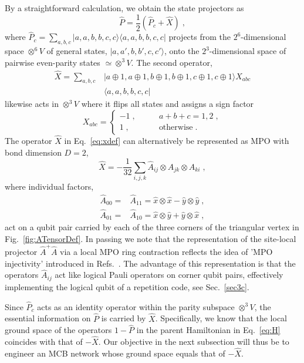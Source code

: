 \documentclass[twocolumn,floats,prx,showpacs]{revtex4-1}
\newcommand{\ket}[1]{|#1\rangle}
\newcommand{\bra}[1]{\langle#1|}
\begin{document}
By a straightforward calculation, we obtain the state projectors as 
\begin{equation}
\hat P =\frac{1}{2} (\hat P_c +\hat X)\;,
\end{equation}
where $\hat P_c=\sum_{a,b,c} \ket{a,a,b,b,c,c} \bra{a,a,b,b,c,c}$
projects from the $2^6$-dimensional space $\otimes^6 V$ of general states, $\ket{a,a',b,b',c,c'}$, onto the $2^3$-dimensional space of 
pairwise even-parity states $\simeq \otimes^3 V$. 
The second operator,
\begin{align}
\hat X=\sum_{a,b,c} &\ket{a\oplus 1,a\oplus 1,b\oplus 1,b\oplus 1,c\oplus 1,c \oplus 1} X_{abc} \nonumber \\ &\bra{a,a,b,b,c,c}
\label{eq:xdef}
\end{align}
likewise acts in $\otimes^3V$ where it flips all states and assigns a sign factor 
\begin{equation}\label{eq:xdef1b}
X_{abc} = \begin{cases} -1\;, \qquad & a+b+c=1,2\;, \\ 1\;, \qquad  &\text{otherwise}\;. 
\end{cases}
\end{equation}
The operator $\hat X$ in Eq.~\eqref{eq:xdef} can alternatively be represented as MPO with bond dimension $D=2$,
\begin{equation}\label{eq:xdef2}
\hat X = - \frac{1}{32} \sum_{i,j,k} \hat A_{ij} \otimes \hat A_{jk} \otimes \hat A_{ki}\;,
\end{equation}
where individual factors, 
\begin{align}\nonumber
\hat A_{00}=& \hat A_{11} = \hat x \otimes \hat x -\hat y \otimes \hat y\;, \\ \label{eq:logpauli}
\hat A_{01}=& \hat A_{10}=\hat x \otimes \hat y + \hat y \otimes \hat x \; ,
\end{align}
act on a qubit pair carried by each of the three corners
of the triangular vertex in Fig.~\ref{fig:ATensorDef}. In passing we note that the representation of the site-local projector $\hat A^+ \hat A$ via a local MPO ring contraction reflects the idea of 'MPO injectivity' introduced in Refs.~\cite{Buerschaper-AnnPhys-2014,1409.2150}.
The advantage of this representation is that the operators $\hat A_{ij}$ act like logical Pauli operators on corner qubit pairs, effectively implementing the logical qubit of a repetition code, see Sec.~\ref{sec3c}.

Since $\hat P_c$ acts as an identity operator within the parity subspace $\otimes^3 V$, the essential information on $\hat P$ is carried by $\hat X$. Specifically, we know that the local ground space of the operators $1-\hat P$ in the parent Hamiltonian in Eq.~\eqref{eq:H} coincides with that of $-\hat X$. Our objective in the next subsection will thus be to engineer an MCB network whose ground space equals that of $-\hat X$. 
\end{document}
